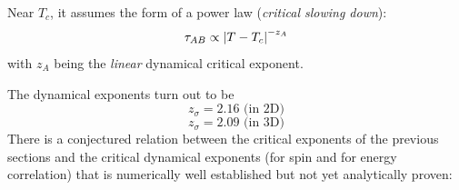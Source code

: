 Near $T_c$, it assumes the form of a power law (\emph{critical slowing down}):
\begin{equation}
\tau_{AB} \propto \left|T-T_c\right|^{-z_A}
\end{equation} with $z_A$ being the \emph{linear} dynamical critical exponent.




The dynamical exponents turn out to be 
$$z_\sigma = 2.16 \text{ (in 2D)}$$ $$z_\sigma = 2.09 \text{ (in 3D)}$$ There is a conjectured relation between the critical exponents of the previous sections and the critical dynamical exponents (for spin and for energy correlation) that is numerically well established but not yet analytically proven:

